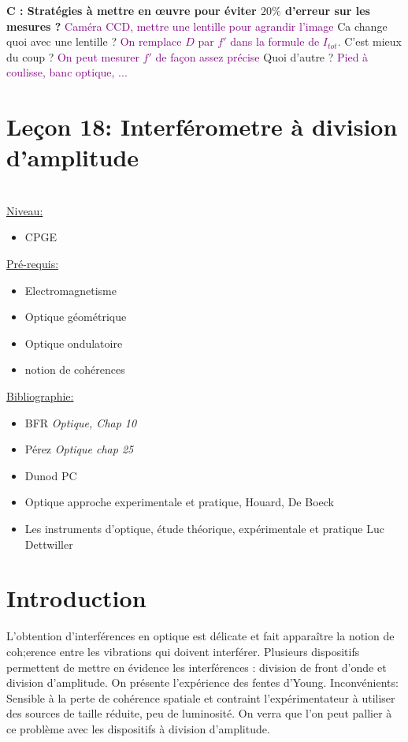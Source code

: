 \documentclass[french, a4paper, 10pt, twocolumn, landscape]{article}
\begin{document}
{  \textbf{C : Stratégies à mettre en \oe uvre pour éviter $20\%$ d'erreur sur les mesures ?} \textcolor{purple}{Caméra CCD, mettre une lentille pour agrandir l'image} Ca change quoi avec une lentille ? \textcolor{purple}{On remplace $D$ par $f'$ dans la formule de $I_{tot}$.} C'est mieux du coup ? \textcolor{purple}{On peut mesurer $f'$ de façon assez précise} Quoi d'autre ? \textcolor{purple}{Pied à coulisse, banc optique, ...}\\
  

}

\clearpage


\section*{Leçon 18: Interférometre à division d'amplitude}

\hrulefill\\
	\underline{Niveau:}
	\begin{itemize}
		\item CPGE
	\end{itemize}
	\underline{Pré-requis:} 
	\begin{itemize}
        \item Electromagnetisme
		\item Optique géométrique
		\item Optique ondulatoire
		\item notion de cohérences
	\end{itemize}
	\underline{Bibliographie:}
	\begin{itemize}
		\item BFR \textit{Optique, Chap 10}
		\item Pérez \textit{Optique chap 25}
		\item Dunod PC
		\item Optique approche experimentale et pratique, Houard, De Boeck
		\item Les instruments d'optique, étude théorique, expérimentale et pratique Luc Dettwiller
    \end{itemize}
\hrulefill


\section*{Introduction}

L'obtention d'interférences en optique est délicate et fait apparaître la notion de coh;erence entre les vibrations qui doivent interférer. Plusieurs dispositifs permettent de mettre en évidence les interférences : division de front d'onde et division d'amplitude. On présente l'expérience des fentes d'Young.
Inconvénients: Sensible à la perte de cohérence spatiale et contraint l'expérimentateur à utiliser des sources de taille réduite, peu de luminosité. On verra que l'on peut pallier à ce problème avec les dispositifs à division d'amplitude. 
\end{document}
